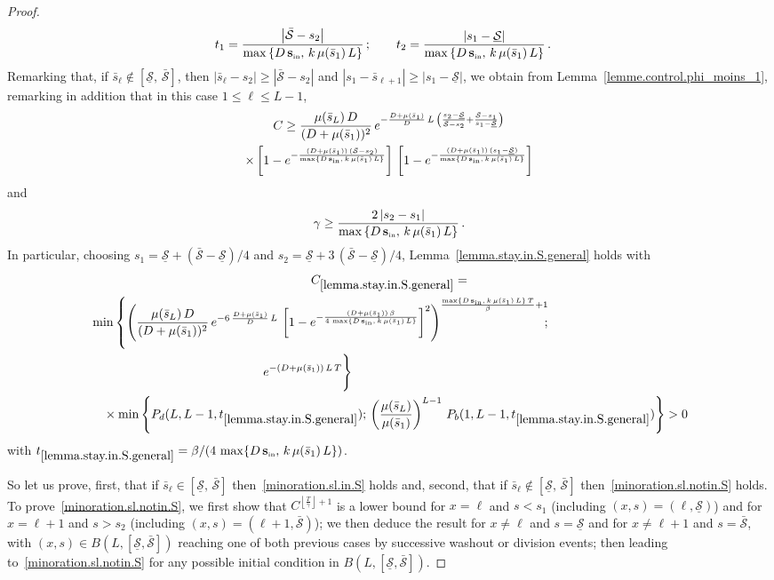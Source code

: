 \documentclass[10pt]{amsart}
\theoremstyle{definition}\newtheorem{defi}[theo]{Definition}\newtheorem{rema}[theo]{Remark}\newtheorem{exam}[theo]{Example}\newtheorem{exem}[theo]{Example}\newtheorem{nota}[theo]{Notation}
\newcommand{\Sin}{{\mathbf s}_{\textrm{\tiny\rm in}}}
\newcommand{\Smin}{\underline{\mathcal{S}}}
\newcommand{\Smax}{\bar{\mathcal{S}}}
\newcommand{\barmu}{\mu(\bar s_1)}
\newcommand{\1}{\mathbf{1}}
\begin{document}
\begin{proof}
\begin{align*}
t_1 &= \frac{\left|\Smax-s_2\right|}{\max
\left\{D\,\Sin,\, k\,\barmu\,L\right\}}\,;\qquad t_2 = \frac{\left|s_1-\Smin\right|}{\max\left\{D\,\Sin,\, k\,\barmu\,L\right\}}\,.
\end{align*}
Remarking that, if $\bar s_\ell \notin [\Smin, \, \Smax]$, then $|\bar s_\ell-s_2|\geq |\Smax-s_2|$ and $|s_1- \bar s_{\ell+1}|\geq |s_1-\Smin|$, we obtain from Lemma~\ref{lemme.control.phi_moins_1}, remarking in addition that in this case $1\leq \ell \leq L-1$,
\begin{multline*}
C \geq \frac{\mu(\bar s_L)\,D}{(D+\barmu)^2}\, e^{-\frac{D+\barmu}{D}\,L\,\left(\frac{s_2-\Smin}{\Smax-s_2} +\frac{\Smax-s_1}{s_1-\Smin}\right)} \\
\times\left[1-e^{-\frac{(D+\barmu)\,(\Smax-s_2)}{\max\left\{D\,\Sin,\,k\,\barmu\,L\right\}}}\right]\,
\left[1-e^{-\frac{(D+\barmu)\,(s_1-\Smin)}{\max\left\{D\,\Sin,\,k\,\barmu\,L\right\}}}\right]
\end{multline*}
and
\[
\gamma \geq \frac{2\,|s_2-s_1|}{\max\left\{D\,\Sin, \, k\,\barmu\,L\right\}}\,.
\]
In particular, choosing $s_1 = \Smin+(\Smax-\Smin)/4$ and $s_2 = \Smin+3\,(\Smax-\Smin)/4$, Lem\-ma~\ref{lemma.stay.in.S.general} holds with
\begin{multline*}
C_{\ref{lemma.stay.in.S.general}}= \\
\begin{aligned}
&\min\left\{
\left(\frac{\mu(\bar s_L)\,D}{(D+\barmu)^2}\, e^{-6\,\frac{D+\barmu}{D}\,L} \,
\left[1-e^{-\frac{(D+\barmu)\,\beta}{4\,\max\left\{D\,\Sin,\,k\,\barmu\,L\right\}}}\right]^2\right)^{\frac{\max\left\{D\,\Sin, \, k\,\barmu\,L\right\}\,T}{\beta}+1}\!\!\!;\right.
\\
&\mkern250mu e^{-(D+\barmu)\,L\,T} \Bigg\}
\\
&\quad
\times \min\left\{ P_d(L,L-1, t_{\ref{lemma.stay.in.S.general}});\,
\left(\frac{\mu(\bar s_L)}{\barmu}\right)^{L-1}\, P_b(1,L-1, t_{\ref{lemma.stay.in.S.general}})
\right\}>0
\end{aligned}
\end{multline*}
with $t_{\ref{lemma.stay.in.S.general}} = \beta/(4\,\max\{D\,\Sin,\, k\,\barmu\,L\})$.


So let us prove, first, that if $\bar s_\ell \in [\Smin, \, \Smax]$ then~\eqref{minoration.sl.in.S} holds and, second, that if $\bar s_\ell \notin [\Smin, \, \Smax]$ then~\eqref{minoration.sl.notin.S} holds. To prove~\eqref{minoration.sl.notin.S}, we first show that $C^{\left\lfloor\frac{T}{\gamma}\right\rfloor+1}$ is a lower bound for $x=\ell$ and $s<s_1$ (including $(x,s)=(\ell,\Smin)$) and for $x=\ell+1$ and $s>s_2$ (including $(x,s)=(\ell+1,\Smax)$); we then deduce the result for $x \neq \ell$ and $s=\Smin$ and for $x\neq \ell+1$ and $s=\Smax$, with $(x,s)\in B(L,[\Smin,\Smax])$ reaching one of both previous cases by successive washout or division events; then leading to~\eqref{minoration.sl.notin.S} for any possible initial condition in $B(L,[\Smin,\Smax])$.


\end{proof}
\end{document}
